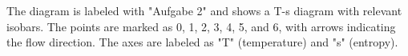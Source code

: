 The diagram is labeled with "Aufgabe 2" and shows a T-s diagram with relevant isobars. The points are marked as 0, 1, 2, 3, 4, 5, and 6, with arrows indicating the flow direction. The axes are labeled as "T" (temperature) and "s" (entropy).